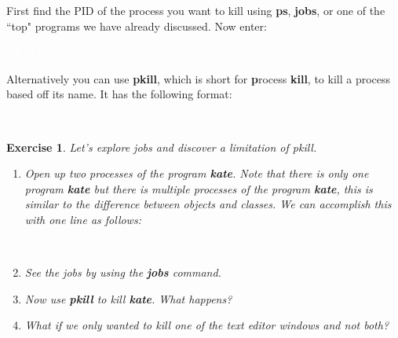 \documentclass[oneside]{book}
\newcommand{\commandline}[1]{\begin{center} \colorbox{Dark}{\textcolor{white}{#1}} \end{center}}
\newtheorem{ex}{Exercise}[chapter]
\begin{document}
    First find the PID of the process you want to kill using \textbf{ps}, \textbf{jobs}, or one of the ``top" programs we have already discussed. Now enter:
    \commandline{kill -9 PID}
    
    Alternatively you can use \textbf{pkill}, which is short for \textbf{p}rocess \textbf{kill}, to kill a process based off its name. It has the following format:
    \commandline{pkill processname}
    
    \begin{ex}
        Let's explore jobs and discover a limitation of pkill.
        \begin{enumerate}
            \item Open up two processes of the program \textbf{kate}. Note that there is only one program \textbf{kate} but there is multiple processes of the program \textbf{kate}, this is similar to the difference between objects and classes. We can accomplish this with one line as follows:
            \commandline{kate \& kate \&}
            \item See the jobs by using the \textbf{jobs} command.
            \item Now use \textbf{pkill} to kill \textbf{kate}. What happens?
            \item What if we only wanted to kill one of the text editor windows and not both? 
        \end{enumerate}
    \end{ex}
\end{document}
